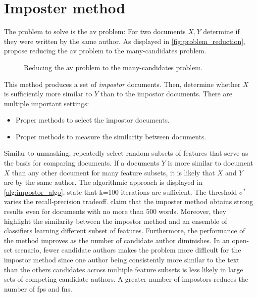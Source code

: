 \section{Imposter method}
\label{sec:impostor_method}

The problem to solve is the \ac{av} problem:
For two documents $X, Y$ determine if they were written by the same author.
As displayed in \autoref{fig:problem_reduction}, \citet{koppel_determining_2014} propose reducing the \ac{av} problem to the many-candidates problem.

\begin{figure}[htbp]
    \centering
    
    \caption{Reducing the \ac{av} problem to the many-candidates problem.}
    \label{fig:problem_reduction}
\end{figure}

This method produces a set of \textit{impostor} documents.
Then, \citet{koppel_determining_2014} determine whether $X$ is sufficiently more similar to $Y$ than to the impostor documents.
There are multiple important settings:
\begin{itemize}
    \item Proper methods to select the impostor documents.
    \item Proper methods to measure the similarity between documents.
\end{itemize}
Similar to unmasking, \citet{koppel_determining_2014} repeatedly select random subsets of features that serve as the basis for comparing documents.
If a documents $Y$ is more similar to document $X$ than any other document for many feature subsets, 
it is likely that $X$ and $Y$ are by the same author.
The algorithmic approach is displayed in \autoref{alg:impostor_algo}.
\citet{koppel_determining_2014} state that k=100 iterations are sufficient.
The threshold $\sigma^*$ varies the recall-precision tradeoff.
\citet{koppel_determining_2014} claim that the imposter method obtains strong results even for documents with no more than 500 words.
Moreover, they highlight the similarity between the impostor method and an ensemble of classifiers learning different subset of features.
Furthermore, the performance of the method improves as the number of candidate author diminishes.
In an open-set scenario, fewer candidate authors makes the problem more difficult for the impostor method 
since one author being consistently more similar to the text than the others candidates across multiple feature subsets is less likely in large sets of competing candidate authors.
A greater number of impostors reduces the number of \acp{fp} and \acp{fn}.

